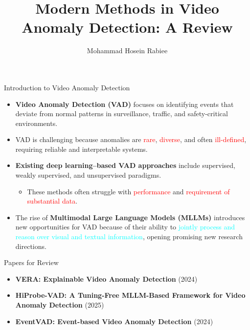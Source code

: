 \documentclass[aspectratio=169,xcolor=dvipsnames]{beamer}
\title{Modern Methods in Video Anomaly Detection: A Review}
\author{
	Mohammad Hosein Rabiee
}
\institute
{
	Department of Computer Science and Statistics \\
	Faculty of Mathematics \\
	K. N. Toosi University of Technology
}
\date{}
\begin{document}
	
	\begin{frame}
		\titlepage
	\end{frame}
	
	\begin{frame}{{Introduction to Video Anomaly Detection}}
		\small
		\begin{itemize}
			\item \textbf{Video Anomaly Detection (VAD)} focuses on identifying 
			events that deviate from normal patterns in surveillance, traffic, and 
			safety-critical environments.
			
			\item VAD is challenging because anomalies are 
			\textcolor{red}{rare}, \textcolor{red}{diverse}, and often 
			\textcolor{red}{ill-defined}, requiring reliable and interpretable systems.
			
			\item \textbf{Existing deep learning–based VAD approaches} include 
			supervised, weakly supervised, and unsupervised paradigms.  
			\begin{itemize}
				\item These methods often struggle with \textcolor{red}{performance} and \textcolor{red}{requirement of substantial data}.
			\end{itemize}
			
			\item The rise of \textbf{Multimodal Large Language Models (MLLMs)} 
			introduces new opportunities for VAD because of their ability to 
			\textcolor{cyan}{jointly process and reason over visual and textual information},  
			opening promising new research directions.
			
		\end{itemize}
	\end{frame}
	
	\begin{frame}{Papers for Review}
		\small
		\begin{itemize}
			\item \faFile \hspace{0.3cm} 
			{\color{cyan}\textbf{VERA: Explainable Video Anomaly Detection}} {\color{gray}(2024)}
			
			\vspace{0.3cm}
			\item \faFile\hspace{0.3cm} 
			{\color{cyan}\textbf{HiProbe-VAD: A Tuning-Free MLLM-Based Framework for Video Anomaly Detection}} {\color{gray}(2025)}
			
			\vspace{0.3cm}
			\item \faFile\hspace{0.3cm} 
			{\color{cyan}\textbf{EventVAD: Event-based Video Anomaly Detection}} {\color{gray}(2024)}
		\end{itemize}
	\end{frame}
	
\end{document}
